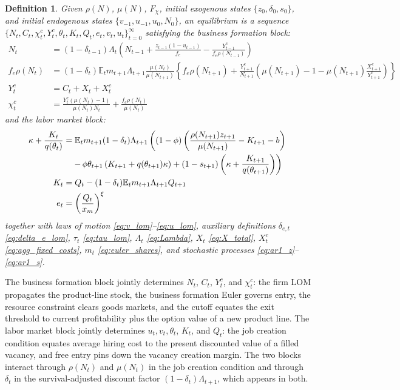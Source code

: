 \documentclass[authoryear, review, 12pt]{elsarticle}
\newtheorem{definition}{Definition}
\begin{document}
	\begin{definition}\label{def:equilibrium}
		Given $\rho(N)$, $\mu(N)$, $F_\chi$, initial exogenous 
		states $\{z_0,\delta_0,s_0\}$, and initial endogenous 
		states $\{v_{-1},u_{-1},u_0,N_0\}$, an equilibrium is 
		a sequence $\{N_t, C_t, \chi_t^c, Y_t^c, \theta_t, 
		K_t, Q_t, e_t, v_t, u_t\}_{t=0}^\infty$ satisfying the 
		business formation block:
		\begin{align}
			\label{eq:N_lom_eq}
			N_t &= (1-\delta_{t-1})\Lambda_t
			\left(N_{t-1} + \frac{z_{t-1}(1-u_{t-1})}{f_e} 
			- \frac{Y_{t-1}^c}{f_e\rho(N_{t-1})}\right) \\
			\label{eq:N_euler_eq}
			f_e\rho(N_t) &= (1-\delta_t)\mathbb{E}_t 
			m_{t+1}\Lambda_{t+1}
			\frac{\mu(N_t)}{\mu(N_{t+1})}
			\left\{f_e\rho(N_{t+1}) + \frac{Y_{t+1}^c}{N_{t+1}}
			\left(\mu(N_{t+1})-1-\mu(N_{t+1})
			\frac{X_{t+1}^c}{Y_{t+1}^c}\right)\right\} \\
			\label{eq:rc}
			Y_t^c &= C_t + X_t + X_t^c \\
			\label{eq:cutoff_eq}
			\chi_t^c &= \frac{Y_t^c(\mu(N_t)-1)}{\mu(N_t)N_t} 
			+ \frac{f_e\rho(N_t)}{\mu(N_t)}
		\end{align}
		and the labor market block:
		\begin{align}
			\label{eq:jcc_eq}
			\kappa+\frac{K_t}{q(\theta_t)} &= 
			\mathbb{E}_t m_{t+1}(1-\delta_t)\Lambda_{t+1}
			\left((1-\phi)\left(\frac{\rho(N_{t+1})z_{t+1}}
			{\mu(N_{t+1})}-K_{t+1}-b\right) \right. \notag \\
			&\quad\left. -\,\phi\theta_{t+1}
			\left(K_{t+1}+q(\theta_{t+1})\kappa\right)
			+(1-s_{t+1})\left(\kappa
			+\frac{K_{t+1}}{q(\theta_{t+1})}\right)\right) \\
			\label{eq:Kdef}
			K_t &= Q_t - (1-\delta_t)\mathbb{E}_t 
			m_{t+1}\Lambda_{t+1}Q_{t+1} \\
			\label{eq:entry_eq}
			e_t &= \left(\frac{Q_t}{x_m}\right)^\xi
		\end{align}
		together with laws of motion 
		\eqref{eq:v_lom}--\eqref{eq:u_lom}, auxiliary 
		definitions $\delta_{e,t}$ \eqref{eq:delta_e_lom}, 
		$\tau_t$ \eqref{eq:tau_lom}, $\Lambda_t$ 
		\eqref{eq:Lambda}, $X_t$ \eqref{eq:X_total}, $X_t^c$ 
		\eqref{eq:agg_fixed_costs}, $m_t$ \eqref{eq:euler_shares}, and 
		stochastic processes \eqref{eq:ar1_z}--\eqref{eq:ar1_s}.
	\end{definition}
	
	The business formation block jointly 
	determines $N_t$, $C_t$, $Y_t^c$, and $\chi_t^c$: 
	the firm LOM propagates the product-line stock, the 
	business formation Euler governs entry, the resource 
	constraint clears goods markets, and the cutoff equates 
	the exit threshold to current profitability plus the 
	option value of a new product line. The labor market 
	block jointly 
	determines $u_t, v_t, \theta_t$, $K_t$, and $Q_t$: the job 
	creation condition equates average hiring cost to the 
	present discounted value of a filled vacancy, and free 
	entry pins down the vacancy creation margin. The two 
	blocks interact through $\rho(N_t)$ and $\mu(N_t)$ 
	in the job creation condition and through $\delta_t$ 
	in the survival-adjusted discount factor 
	$(1-\delta_t)\Lambda_{t+1}$, which appears in both.
\end{document}
